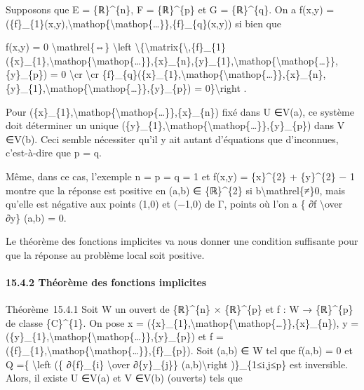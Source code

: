 \documentclass[]{article}
\begin{document}
Supposons que E = \{ℝ\}\^{}\{n\}, F = \{ℝ\}\^{}\{p\} et G =
\{ℝ\}\^{}\{q\}. On a f(x,y) =
(\{f\}\_\{1\}(x,y),\textbackslash{}mathop\{\textbackslash{}mathop\{\ldots{}\}\},\{f\}\_\{q\}(x,y))
si bien que

f(x,y) = 0 \textbackslash{}mathrel\{⇔\} \textbackslash{}left
\textbackslash{}\{\textbackslash{}matrix\{\textbackslash{},\{f\}\_\{1\}(\{x\}\_\{1\},\textbackslash{}mathop\{\textbackslash{}mathop\{\ldots{}\}\},\{x\}\_\{n\},\{y\}\_\{1\},\textbackslash{}mathop\{\textbackslash{}mathop\{\ldots{}\}\},\{y\}\_\{p\})
= 0 \textbackslash{}cr \textbackslash{}cr
\{f\}\_\{q\}(\{x\}\_\{1\},\textbackslash{}mathop\{\textbackslash{}mathop\{\ldots{}\}\},\{x\}\_\{n\},\{y\}\_\{1\},\textbackslash{}mathop\{\textbackslash{}mathop\{\ldots{}\}\},\{y\}\_\{p\})
= 0\}\textbackslash{}right .

Pour
(\{x\}\_\{1\},\textbackslash{}mathop\{\textbackslash{}mathop\{\ldots{}\}\},\{x\}\_\{n\})
fixé dans U ∈V(a), ce système doit déterminer un unique
(\{y\}\_\{1\},\textbackslash{}mathop\{\textbackslash{}mathop\{\ldots{}\}\},\{y\}\_\{p\})
dans V ∈V(b). Ceci semble nécessiter qu'il y ait autant d'équations que
d'inconnues, c'est-à-dire que p = q.

Même, dans ce cas, l'exemple n = p = q = 1 et f(x,y) = \{x\}\^{}\{2\} +
\{y\}\^{}\{2\} − 1 montre que la réponse est positive en (a,b) ∈
\{ℝ\}\^{}\{2\} si b\textbackslash{}mathrel\{≠\}0, mais qu'elle est
négative aux points (1,0) et (−1,0) de Γ, points où l'on a \{ ∂f
\textbackslash{}over ∂y\} (a,b) = 0.

Le théorème des fonctions implicites va nous donner une condition
suffisante pour que la réponse au problème local soit positive.

\paragraph{15.4.2 Théorème des fonctions implicites}

Théorème~15.4.1 Soit W un ouvert de \{ℝ\}\^{}\{n\} × \{ℝ\}\^{}\{p\} et f
: W → \{ℝ\}\^{}\{p\} de classe \{C\}\^{}\{1\}. On pose x =
(\{x\}\_\{1\},\textbackslash{}mathop\{\textbackslash{}mathop\{\ldots{}\}\},\{x\}\_\{n\}),
y =
(\{y\}\_\{1\},\textbackslash{}mathop\{\textbackslash{}mathop\{\ldots{}\}\},\{y\}\_\{p\})
et f =
(\{f\}\_\{1\},\textbackslash{}mathop\{\textbackslash{}mathop\{\ldots{}\}\},\{f\}\_\{p\}).
Soit (a,b) ∈ W tel que f(a,b) = 0 et Q =\{ \textbackslash{}left (\{
∂\{f\}\_\{i\} \textbackslash{}over ∂\{y\}\_\{j\}\}
(a,b)\textbackslash{}right )\}\_\{1≤i,j≤p\} est inversible. Alors, il
existe U ∈V(a) et V ∈V(b) (ouverts) tels que
\end{document}

